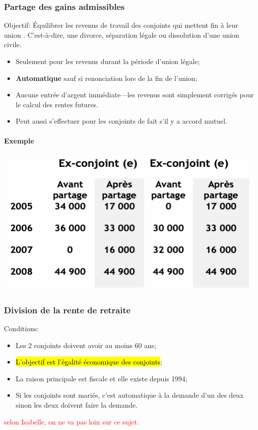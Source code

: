 \documentclass[10pt, french]{article}
\begin{document}
\begin{multicols*}{3}
\subsubsection*{Partage des gains admissibles}
Objectif: Équilibrer les revenus de travail des conjoints qui \og mettent fin à leur union \fg{}. C'est-à-dire, une divorce, séparation légale ou dissolution d'une union civile.
\begin{itemize}[leftmargin = *]
	\item	Seulement pour les revenus durant la période d'union légale;
	\item	\textbf{Automatique} sauf si renonciation lors de la fin de l'union;
	\item	Aucune entrée d'argent immédiate---les revenus sont simplement corrigés pour le calcul des rentes futures.
		\item 	Peut aussi s'effectuer pour les conjoints de fait s'il y a accord mutuel.
\end{itemize}


\paragraph*{Exemple}
\begin{center}
	\includegraphics[scale=0.4]{src/ACT-1005/exemple-DIVORCE.png}
\end{center}


\subsubsection*{Division de la rente de retraite}
Conditions:
\begin{itemize}[leftmargin = *]
	\item	Les 2 conjoints doivent avoir au moins 60 ans;
	\item	\hl{L'objectif est l'égalité économique des conjoints};
	\item	La raison principale est fiscale et elle existe depuis 1994;
	\item	Si les conjoints sont mariés, c'est automatique à la demande d'un des deux sinon les deux doivent faire la demande.
\end{itemize}
\textcolor{red}{selon Isabelle, on ne va pas loin sur ce sujet.}



\end{multicols*}
\end{document}
